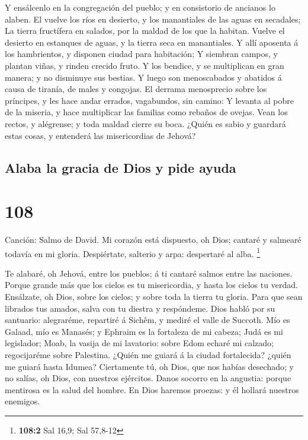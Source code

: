  Y ensálcenlo en la congregación del pueblo; y en
consistorio de ancianos lo alaben.  El vuelve los ríos en
desierto, y los manantiales de las aguas en secadales;  La
tierra fructífera en salados, por la maldad de los que la habitan.
 Vuelve el desierto en estanques de aguas, y la tierra seca
en manantiales.  Y allí aposenta á los hambrientos, y
disponen ciudad para habitación;  Y siembran campos, y
plantan viñas, y rinden crecido fruto.  Y los bendice, y se
multiplican en gran manera; y no disminuye sus bestias.  Y
luego son menoscabados y abatidos á causa de tiranía, de males y
congojas.  El derrama menosprecio sobre los príncipes, y
les hace andar errados, vagabundos, sin camino:  Y levanta
al pobre de la miseria, y hace multiplicar las familias como rebaños de
ovejas.  Vean los rectos, y alégrense; y toda maldad cierre
su boca.  ¿Quién es sabio y guardará estas cosas, y
entenderá las misericordias de Jehová?

\hypertarget{alaba-la-gracia-de-dios-y-pide-ayuda}{%
\subsection{Alaba la gracia de Dios y pide
ayuda}\label{alaba-la-gracia-de-dios-y-pide-ayuda}}

\hypertarget{section-107}{%
\section{108}\label{section-107}}

 Canción: Salmo de David. Mi corazón está dispuesto, oh
Dios; cantaré y salmearé todavía en mi gloria.  Despiértate,
salterio y arpa: despertaré al alba. \footnote{\textbf{108:2} Sal 16,9;
  Sal 57,8-12}

 Te alabaré, oh Jehová, entre los pueblos; á ti cantaré
salmos entre las naciones.  Porque grande más que los cielos
es tu misericordia, y hasta los cielos tu verdad. 
Ensálzate, oh Dios, sobre los cielos; y sobre toda la tierra tu gloria.
 Para que sean librados tus amados, salva con tu diestra y
respóndeme.  Dios habló por su santuario: alegraréme,
repartiré á Sichêm, y mediré el valle de Succoth.  Mío es
Galaad, mío es Manasés; y Ephraim es la fortaleza de mi cabeza; Judá es
mi legislador;  Moab, la vasija de mi lavatorio: sobre Edom
echaré mi calzado; regocijaréme sobre Palestina.  ¿Quién me
guiará á la ciudad fortalecida? ¿quién me guiará hasta Idumea?
 Ciertamente tú, oh Dios, que nos habías desechado; y no
salías, oh Dios, con nuestros ejércitos.  Danos socorro en
la angustia: porque mentirosa es la salud del hombre.  En
Dios haremos proezas: y él hollará nuestros enemigos.

